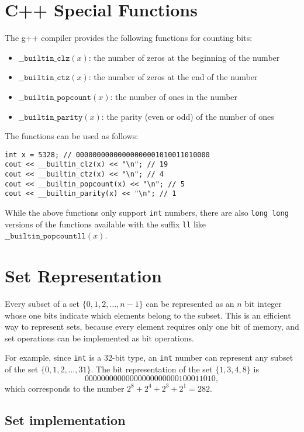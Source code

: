 \documentclass[twoside,12pt,a4paper,english]{book}
\theoremstyle{definition}
\theoremstyle{problemstyle}
\begin{document}
\section{C++ Special Functions}
The g++ compiler provides the following
functions for counting bits:

\begin{itemize}
\item
$\texttt{\_\_builtin\_clz}(x)$:
the number of zeros at the beginning of the number
\item
$\texttt{\_\_builtin\_ctz}(x)$:
the number of zeros at the end of the number
\item
$\texttt{\_\_builtin\_popcount}(x)$:
the number of ones in the number
\item
$\texttt{\_\_builtin\_parity}(x)$:
the parity (even or odd) of the number of ones
\end{itemize}
\begin{samepage}

The functions can be used as follows:
\begin{lstlisting}
int x = 5328; // 00000000000000000001010011010000
cout << __builtin_clz(x) << "\n"; // 19
cout << __builtin_ctz(x) << "\n"; // 4
cout << __builtin_popcount(x) << "\n"; // 5
cout << __builtin_parity(x) << "\n"; // 1
\end{lstlisting}
\end{samepage}

While the above functions only support \texttt{int} numbers,
there are also \texttt{long long} versions of
the functions available with the suffix \texttt{ll} like $\texttt{\_\_builtin\_popcountll}(x)$.
\section{Set Representation}
Every subset of a set
$\{0,1,2,\ldots,n-1\}$
can be represented as an $n$ bit integer
whose one bits indicate which
elements belong to the subset.
This is an efficient way to represent sets,
because every element requires only one bit of memory,
and set operations can be implemented as bit operations.

For example, since \texttt{int} is a 32-bit type,
an \texttt{int} number can represent any subset
of the set $\{0,1,2,\ldots,31\}$.
The bit representation of the set $\{1,3,4,8\}$ is
\[00000000000000000000000100011010,\]
which corresponds to the number $2^8+2^4+2^3+2^1=282$.

\subsection{Set implementation}
\end{document}
